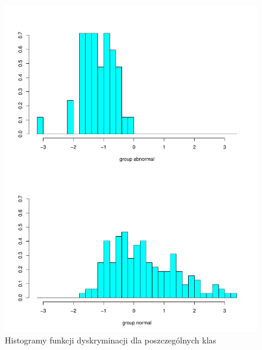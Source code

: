 \documentclass[10pt,a4paper]{article}
\begin{document}
\begin{figure}[H]
\includegraphics[scale=0.5]{ldahist.pdf}
\caption{Histogramy funkcji dyskryminacji dla poszczególnych klas}
\end{figure}
\end{document}
